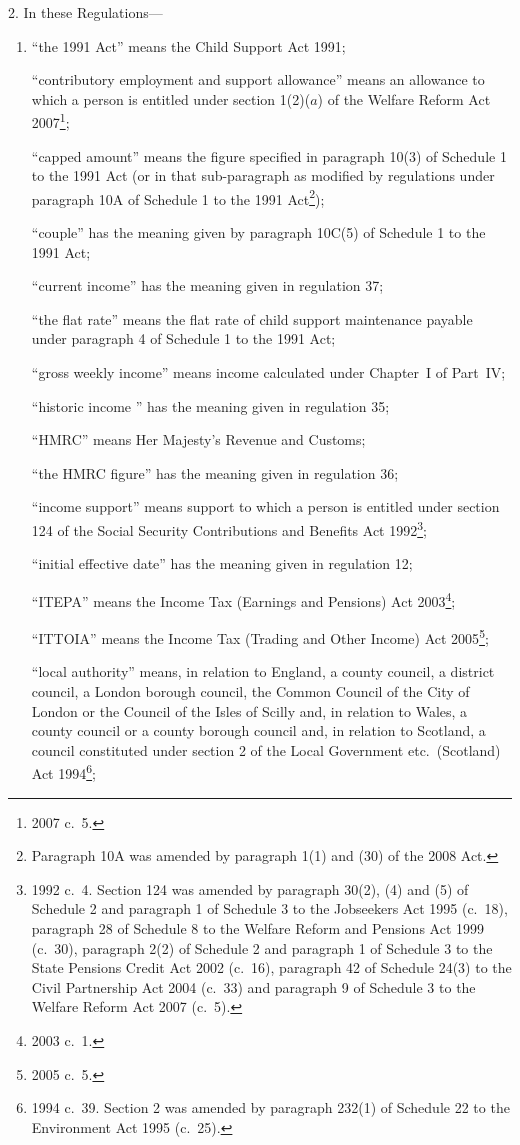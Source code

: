 \documentclass[12pt,a4paper]{article}
\begin{document}
2.  In these Regulations—
\begin{enumerate}\item[]
“the 1991 Act” means the Child Support Act 1991;

“contributory employment and support allowance” means an allowance to which a person is entitled under section 1(2)($a$)  of the Welfare Reform Act 2007\footnote{2007 c.~5.};

“capped amount” means the figure specified in paragraph 10(3) of Schedule 1 to the 1991 Act (or in that sub-paragraph as modified by regulations under paragraph 10A of Schedule 1 to the 1991 Act\footnote{Paragraph 10A was amended by paragraph 1(1) and (30) of the 2008 Act.});

“couple” has the meaning given by paragraph 10C(5) of Schedule 1 to the 1991 Act;

“current income” has the meaning given in regulation 37;

“the flat rate” means the flat rate of child support maintenance payable under paragraph 4 of Schedule 1 to the 1991 Act;

“gross weekly income” means income calculated under Chapter~I of Part~IV;

“historic income ” has the meaning given in regulation 35;

“HMRC” means Her Majesty’s Revenue and Customs;

“the HMRC figure” has the meaning given in regulation 36;

“income support” means support to which a person is entitled under section 124 of the Social Security Contributions and Benefits Act 1992\footnote{1992 c.~4. Section 124 was amended by paragraph 30(2), (4) and (5) of Schedule 2 and paragraph 1 of Schedule 3 to the Jobseekers Act 1995 (c.~18), paragraph 28 of Schedule 8 to the Welfare Reform and Pensions Act 1999 (c.~30), paragraph 2(2) of Schedule 2 and paragraph 1 of Schedule 3 to the State Pensions Credit Act 2002 (c.~16), paragraph 42 of Schedule 24(3) to the Civil Partnership Act 2004 (c.~33) and paragraph 9 of Schedule 3 to the Welfare Reform Act 2007 (c.~5).};

“initial effective date” has the meaning given in regulation 12;

“ITEPA” means the Income Tax (Earnings and Pensions) Act 2003\footnote{2003 c.~1.};

“ITTOIA” means the Income Tax (Trading and Other Income) Act 2005\footnote{2005 c.~5.};

“local authority” means, in relation to England, a county council, a district council, a London borough council, the Common Council of the City of London or the Council of the Isles of Scilly and, in relation to Wales, a county council or a county borough council and, in relation to Scotland, a council constituted under section 2 of the Local Government etc.\ (Scotland) Act 1994\footnote{1994 c.~39. Section 2 was amended by paragraph 232(1) of Schedule 22 to the Environment Act 1995 (c.~25).};


\end{enumerate}
\end{document}
